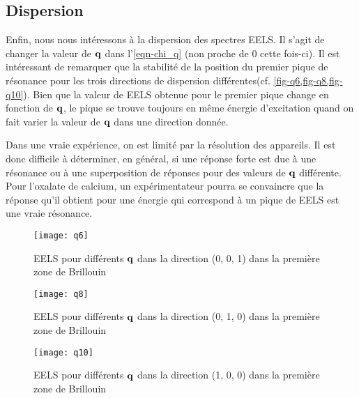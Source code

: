 \subsection{Dispersion}
Enfin, nous nous intéressons à la dispersion des spectres EELS\@.
Il s'agit de changer la valeur de $\vb{q}$ dans l'\cref{eqn-chi_q} (non proche de 0 cette fois-ci).
Il est intéressant de remarquer que la stabilité de la position du premier pique de résonance
pour les trois directions de dispersion différentes(cf. \cref{fig-q6,fig-q8,fig-q10}).
Bien que la valeur de EELS obtenue pour le premier pique change en fonction de $\vb{q}$,
le pique se trouve toujours en même énergie d'excitation
quand on fait varier la valeur de $\vb{q}$ dans une direction donnée.

Dans une vraie expérience, on est limité par la résolution des appareils.
Il est donc difficile à déterminer, en général, si une réponse forte est due
à une résonance ou à une superposition de réponses pour des valeurs de $\vb{q}$ différente.
Pour l'oxalate de calcium, un expérimentateur pourra se convaincre que la réponse qu'il obtient
pour une énergie qui correspond à un pique de EELS est une vraie résonance.

\begin{figure}[!b]
    \centering
    \texttt{[image: q6]}
    \captionsetup{width=0.6\textwidth}
    \caption{EELS pour différents $\vb{q}$ dans la direction (0, 0, 1) dans la première zone de Brillouin}\label{fig-q6}
\end{figure}
\clearpage
\begin{figure}[!htb]
    \centering
    \texttt{[image: q8]}
    \captionsetup{width=0.6\textwidth}
    \caption{EELS pour différents $\vb{q}$ dans la direction (0, 1, 0) dans la première zone de Brillouin}\label{fig-q8}
\end{figure}

\begin{figure}[!htb]
    \centering
    \texttt{[image: q10]}
    \captionsetup{width=0.6\textwidth}
    \caption{EELS pour différents $\vb{q}$ dans la direction (1, 0, 0) dans la première zone de Brillouin}\label{fig-q10}
\end{figure}
